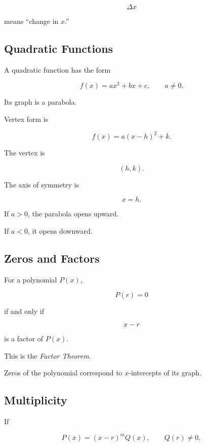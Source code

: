 \[ \Delta x \]

means ``change in \(x\).''

\subsection{Quadratic Functions}
\label{subsec:quadratic-functions-analysis}

A quadratic function has the form

\[ f(x)=ax^2+bx+c,\qquad a\neq0. \]

Its graph is a parabola.

Vertex form is

\[ f(x)=a(x-h)^2+k. \]

The vertex is

\[ (h,k). \]

The axis of symmetry is

\[ x=h. \]

If \(a>0\), the parabola opens upward.

If \(a<0\), it opens downward.

\subsection{Zeros and Factors}
\label{subsec:polynomial-zeros-factors}

For a polynomial \(P(x)\),

\[ P(r)=0 \]

if and only if

\[ x-r \]

is a factor of \(P(x)\).

This is the \emph{Factor Theorem}.

Zeros of the polynomial correspond to \(x\)-intercepts of its graph.

\subsection{Multiplicity}
\label{subsec:zero-multiplicity}

If

\[ P(x)=(x-r)^mQ(x), \qquad Q(r)\neq0, \]

